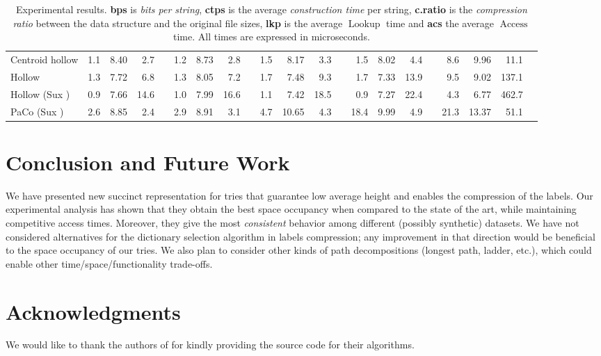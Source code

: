 \documentclass[a4paper,11pt]{article}
\theoremstyle{nonumberplain}
\DeclareMathOperator{\Access}{Access}
\DeclareMathOperator{\Lookup}{Lookup}
\begin{document}
\begin{table}[tbp]
\begin{center}
{\begin{tabular}{lrrrr|rrrr|rrrr|rrrr|rrrr}
\midrule
Centroid hollow &  1.1 & 8.40 & 2.7 &  & 1.2 & 8.73 & 2.8 &  & 1.5 & 8.17 & 3.3 &  & 1.5 & 8.02 & 4.4 &  & 8.6 & 9.96 & 11.1 &  \\
Hollow &  1.3 & 7.72 & 6.8 &  & 1.3 & 8.05 & 7.2 &  & 1.7 & 7.48 & 9.3 &  & 1.7 & 7.33 & 13.9 &  & 9.5 & 9.02 & 137.1 &  \\
Hollow (Sux \cite{sux}) &  0.9 & 7.66 & 14.6 &  & 1.0 & 7.99 & 16.6 &  & 1.1 & 7.42 & 18.5 &  & 0.9 & 7.27 & 22.4 &  & 4.3 & 6.77 & 462.7 &  \\
PaCo (Sux \cite{sux}) &  2.6 & 8.85 & 2.4 &  & 2.9 & 8.91 & 3.1 &  & 4.7 & 10.65 & 4.3 &  & 18.4 & 9.99 & 4.9 &  & 21.3 & 13.37 & 51.1 &  \\
\bottomrule
\end{tabular}
    }
  \end{center}
  \caption{Experimental results. \textbf{bps} is \emph{bits per string}, \textbf{ctps} 
    is the average \emph{construction time} per string, \textbf{c.ratio} is the \emph{compression ratio} 
    between the data structure and the original file sizes, 
    \textbf{lkp} is the average \emph{$\Lookup$} time and \textbf{acs} the average \emph{$\Access$} time. 
    All times are expressed in microseconds.
  }
  \label{tab:results}
\end{table}

\section{Conclusion and Future Work}

We have presented new succinct representation for tries that guarantee
low average height and enables the compression of the labels. Our
experimental analysis has shown that they obtain the best space
occupancy when compared to the state of the art, while maintaining
competitive access times. Moreover, they give the most
\emph{consistent} behavior among different (possibly synthetic)
datasets.
We have not considered alternatives for the dictionary selection
algorithm in labels compression; any improvement in that direction
would be beneficial to the space occupancy of our tries. We also plan
to consider other kinds of path decompositions (longest path, ladder,
etc.), which could enable other time/space/functionality trade-offs.

\section*{Acknowledgments}
We would like to thank the authors of \cite{csd11} for kindly providing the
source code for their algorithms.



\end{document}
